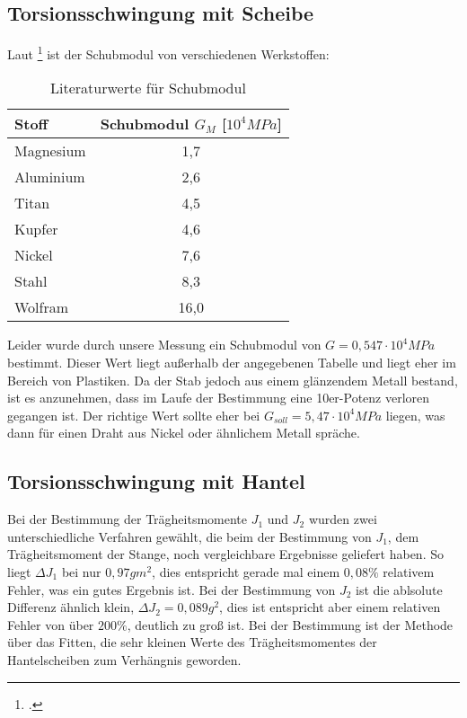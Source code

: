 \subsection{Torsionsschwingung mit Scheibe}
Laut \footcite{elektrotechnik} ist der Schubmodul von verschiedenen Werkstoffen:


\begin{table}[H]
  \centering
  \begin{tabular}{l | c}
    Stoff & Schubmodul $G_M$ [$10^4MPa$] \\ \hline
    Magnesium & 1,7 \\
    Aluminium & 2,6 \\
    Titan & 4,5 \\
    Kupfer & 4,6 \\
    Nickel & 7,6 \\
    Stahl & 8,3 \\
    Wolfram & 16,0
  \end{tabular}
  \caption{Literaturwerte für Schubmodul}
  \label{tab:litwertschub}
\end{table}

Leider wurde durch unsere Messung ein Schubmodul von $G=0,547\cdot10^4 MPa$ bestimmt. Dieser Wert liegt außerhalb der angegebenen Tabelle und liegt eher im Bereich von Plastiken. Da der Stab jedoch aus einem glänzendem Metall bestand, ist es anzunehmen, dass im Laufe der Bestimmung eine 10er-Potenz verloren gegangen ist. Der richtige Wert sollte eher bei $G_{soll}=5,47\cdot10^4 MPa$ liegen, was dann für einen Draht aus Nickel oder ähnlichem Metall spräche.

\subsection{Torsionsschwingung mit Hantel}
Bei der Bestimmung der Trägheitsmomente $J_1$ und $J_2$ wurden zwei unterschiedliche Verfahren gewählt, die beim der Bestimmung von $J_1$, dem Trägheitsmoment der Stange, noch vergleichbare Ergebnisse geliefert haben. So liegt $\Delta J_1$ bei nur $0,97gm^2$, dies entspricht gerade mal einem $0,08\%$ relativem Fehler, was ein gutes Ergebnis ist.
Bei der Bestimmung von $J_2$ ist die ablsolute Differenz ähnlich klein, $\Delta J_2=0,089g^2$, dies ist entspricht aber einem relativen Fehler von über $200\%$, deutlich zu groß ist. 
Bei der Bestimmung ist der Methode über das Fitten, die sehr kleinen Werte des Trägheitsmomentes der Hantelscheiben zum Verhängnis geworden.
